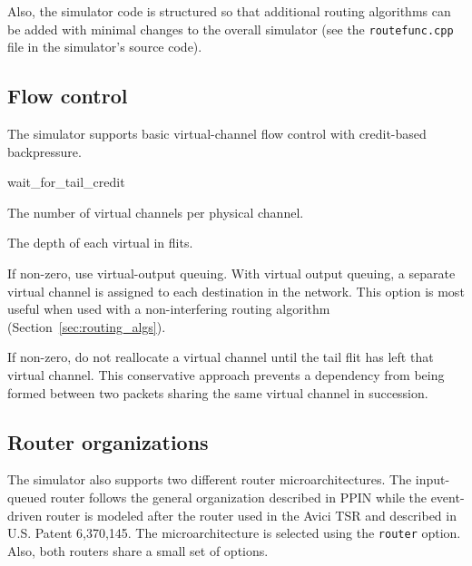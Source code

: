 \documentclass[11pt]{article}
\begin{document}
Also, the simulator code is structured so that additional routing
algorithms can be added with minimal changes to the overall simulator
(see the \texttt{routefunc.cpp} file in the simulator's source code).

\subsection{Flow control}

The simulator supports basic virtual-channel flow control with
credit-based backpressure.  

\begin{opt_list}{wait\_for\_tail\_credit}

\item[num\_vcs] The number of virtual channels per physical channel.

\item[vc\_buf\_size] The depth of each virtual in flits.

\item[voq] If non-zero, use virtual-output queuing.  With virtual
output queuing, a separate virtual channel is assigned to each
destination in the network.  This option is most useful when used with
a non-interfering routing algorithm (Section~\ref{sec:routing_algs}).
  
\item[wait\_for\_tail\_credit] If non-zero, do not reallocate a virtual
channel until the tail flit has left that virtual channel.  This
conservative approach prevents a dependency from being formed between
two packets sharing the same virtual channel in succession.
\end{opt_list}

\subsection{Router organizations}

The simulator also supports two different router microarchitectures.
The input-queued router follows the general organization described in
PPIN while the event-driven router is modeled after the router used in
the Avici TSR and described in U.S. Patent 6,370,145.  The
microarchitecture is selected using the \texttt{router} option.  Also,
both routers share a small set of options.
\end{document}

